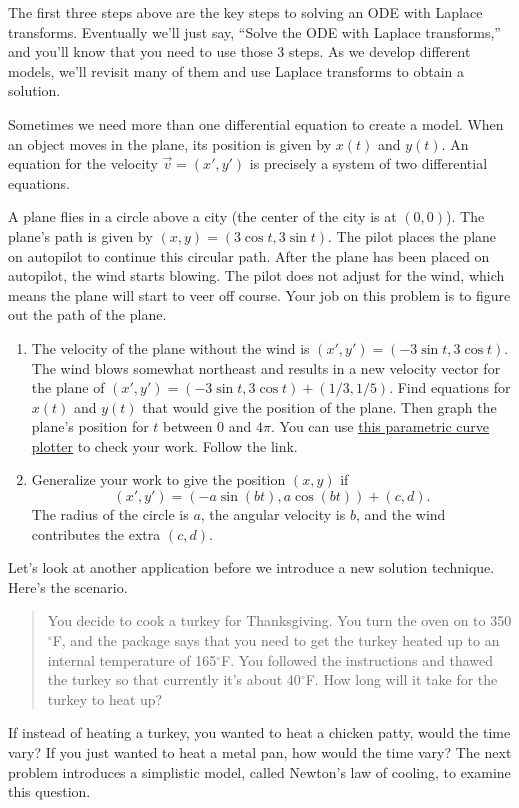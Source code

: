 The first three steps above are the key steps to solving an ODE with Laplace transforms.  Eventually we'll just say, ``Solve the ODE with Laplace transforms,'' and you'll know that you need to use those 3 steps. As we develop different models, we'll revisit many of them and use Laplace transforms to obtain a solution.

\mysubsection{\ideaE}

Sometimes we need more than one differential equation to create a model. When an object moves in the plane, its position is given by $x(t)$ and $y(t)$. An equation for the velocity $\vec v = (x',y')$ is precisely a system of two differential equations.

\begin{problem}
A plane flies in a circle above a city (the center of the city is at $(0,0)$).  The plane's path is given by $(x,y) = (3\cos t, 3\sin t)$.  The pilot places the plane on autopilot to continue this circular path. After the plane has been placed on autopilot, the wind starts blowing. The pilot does not adjust for the wind, which means the plane will start to veer off course.  Your job on this problem is to figure out the path of the plane.
\begin{enumerate}
 \item The velocity of the plane without the wind is $(x',y') = (-3\sin t, 3\cos t)$.  The wind blows somewhat northeast and results in a new velocity vector for the plane of $(x',y') = (-3\sin t, 3\cos t)+(1/3, 1/5)$. Find equations for $x(t)$ and $y(t)$ that would give the position of the plane. Then graph the plane's position for $t$ between 0 and $4\pi$. You can use \href{http://bmw.byuimath.com/dokuwiki/doku.php?id=parametric_curve_plotter}{this parametric curve plotter} to check your work. Follow the link.
 \item Generalize your work to give the position $(x,y)$ if $$(x',y') = (-a\sin(b t), a\cos(b t))+(c, d).$$
The radius of the circle is $a$, the angular velocity is $b$, and the wind contributes the extra $(c,d)$.  
\end{enumerate}
\end{problem}







\mysubsection{\ideaA}


Let's look at another application before we introduce a new solution technique.  Here's the scenario.
\begin{quote}
You decide to cook a turkey for Thanksgiving. You turn the oven on to 350$^\circ$F, and the package says that you need to get the turkey heated up to an internal temperature of 165$^\circ$F.  You followed the instructions and thawed the turkey so that currently it's about 40$^\circ$F.  How long will it take for the turkey to heat up? 
\end{quote}
If instead of heating a turkey, you wanted to heat a chicken patty, would the time vary?  If you just wanted to heat a metal pan, how would the time vary? The next problem introduces a simplistic model, called Newton's law of cooling, to examine this question.  

